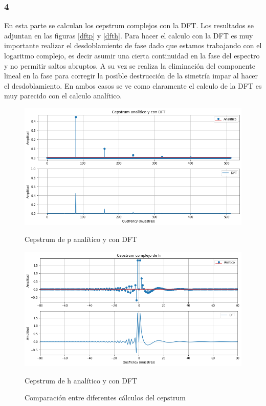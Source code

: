 \documentclass[a4paper]{article}
\begin{document}
\subsubsection{4}
En esta parte se calculan los cepstrum complejos con la DFT. Los resultados se adjuntan en las figuras \ref{dftp} y \ref{dfth}. Para hacer el calculo con la DFT es muy importante realizar el desdoblamiento de fase dado que estamos trabajando con el logaritmo complejo, es decir asumir una cierta continuidad en la fase del espectro y no permitir saltos abruptos. A su vez se realiza la eliminación del componente lineal en la fase para corregir la posible destrucción de la simetría impar al hacer el desdoblamiento. En ambos casos se ve como claramente el calculo de la DFT es muy parecido con el calculo analítico. 

\begin{figure}[!h]
\begin{minipage}[b]{0.5\linewidth}
\centering
\includegraphics[width=\linewidth]{dftp.png}
\caption{Cepstrum de p analítico y con DFT}
\label{dftp}
\end{minipage}
\hspace{0.5cm}
\begin{minipage}[b]{0.5\linewidth}
\centering
\includegraphics[width=\linewidth]{dfth.png}
\caption{Cepstrum de h analítico y con DFT}
\label{dfth}
\end{minipage}
\caption{Comparación entre diferentes cálculos del cepstrum}
\label{comparacion1}
\end{figure}
\end{document}
